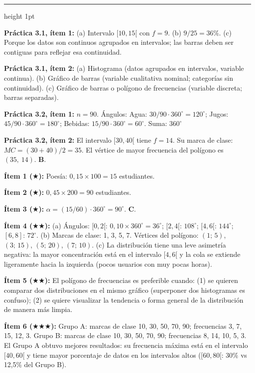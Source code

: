 \documentclass[11pt, letterpaper]{article}
\newcommand{\subbloque}[1]{%
  \vspace{14pt}
  \noindent{\large\bfseries\color{zenitnavy} #1}\par
  \vspace{4pt}\hrule height 1pt\vspace{8pt}}
\begin{document}
\subbloque{Sección 3 --- Gráficos estadísticos}

\textbf{Práctica 3.1, ítem 1:}
(a) Intervalo $[10,15[$ con $f=9$.
(b) $9/25=36\%$.
(c) Porque los datos son continuos agrupados en intervalos; las barras deben ser contiguas para reflejar esa continuidad.

\textbf{Práctica 3.1, ítem 2:}
(a) Histograma (datos agrupados en intervalos, variable continua).
(b) Gráfico de barras (variable cualitativa nominal; categorías sin continuidad).
(c) Gráfico de barras o polígono de frecuencias (variable discreta; barras separadas).

\textbf{Práctica 3.2, ítem 1:}
$n=90$. Ángulos: Agua: $30/90 \cdot 360^\circ=120^\circ$; Jugos: $45/90 \cdot 360^\circ=180^\circ$; Bebidas: $15/90 \cdot 360^\circ=60^\circ$. Suma: $360^\circ$ \checkmark

\textbf{Práctica 3.2, ítem 2:}
El intervalo $[30,40[$ tiene $f=14$. Su marca de clase: $MC=(30+40)/2=35$. El vértice de mayor frecuencia del polígono es $(35,\ 14)$. \textbf{B}.

\textbf{Ítem 1 ($\bigstar$):} Poesía: $0{,}15\times100=15$ estudiantes.

\textbf{Ítem 2 ($\bigstar$):} $0{,}45\times200=90$ estudiantes.

\textbf{Ítem 3 ($\bigstar$):} $\alpha = (15/60)\cdot360^\circ=90^\circ$. \textbf{C}.

\textbf{Ítem 4 ($\bigstar\bigstar$):}
(a) Ángulos: $[0,2[$: $0{,}10\times360^\circ=36^\circ$; $[2,4[$: $108^\circ$; $[4,6[$: $144^\circ$; $[6,8]$: $72^\circ$.
(b) Marcas de clase: 1, 3, 5, 7. Vértices del polígono: $(1;\,5)$, $(3;\,15)$, $(5;\,20)$, $(7;\,10)$.
(c) La distribución tiene una leve asimetría negativa: la mayor concentración está en el intervalo $[4,6[$ y la cola se extiende ligeramente hacia la izquierda (pocos usuarios con muy pocas horas).

\textbf{Ítem 5 ($\bigstar\bigstar$):} El polígono de frecuencias es preferible cuando: (1) se quieren comparar dos distribuciones en el mismo gráfico (superponer dos histogramas es confuso); (2) se quiere visualizar la tendencia o forma general de la distribución de manera más limpia.

\textbf{Ítem 6 ($\bigstar\bigstar\bigstar$):}
Grupo A: marcas de clase 10, 30, 50, 70, 90; frecuencias 3, 7, 15, 12, 3.
Grupo B: marcas de clase 10, 30, 50, 70, 90; frecuencias 8, 14, 10, 5, 3.
El Grupo A obtuvo mejores resultados: su frecuencia máxima está en el intervalo $[40,60[$ y tiene mayor porcentaje de datos en los intervalos altos ($[60,80[$: 30\% vs 12{,}5\% del Grupo B).
\end{document}
